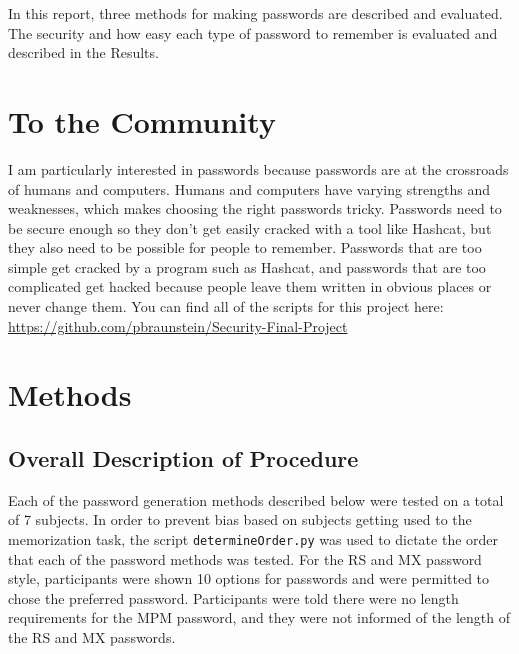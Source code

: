 \documentclass{article}
\begin{document}
In this report, three methods for making passwords are described and evaluated. The security and how easy each type of password to remember is evaluated and described in the Results.

\section*{To the Community}
I am particularly interested in passwords because passwords are at the crossroads of humans and computers. Humans and computers have varying strengths and weaknesses, which makes choosing the right passwords tricky. Passwords need to be secure enough so they don't get easily cracked with a tool like Hashcat, but they also need to be possible for people to remember. Passwords that are too simple get cracked by a program such as Hashcat, and passwords that are too complicated get hacked because people leave them written in obvious places or never change them. You can find all of the scripts for this project here: \url{https://github.com/pbraunstein/Security-Final-Project}

\section*{Methods}
\subsection*{Overall Description of Procedure}
Each of the password generation methods described below were tested on a total of 7 subjects. In order to prevent bias based on subjects getting used to the memorization task, the script \texttt{determineOrder.py} was used to dictate the order that each of the password methods was tested. For the RS and MX password style, participants were shown 10 options for passwords and were permitted to chose the preferred password. Participants were told there were no length requirements for the MPM password, and they were not informed of the length of the RS and MX passwords.
\end{document}
